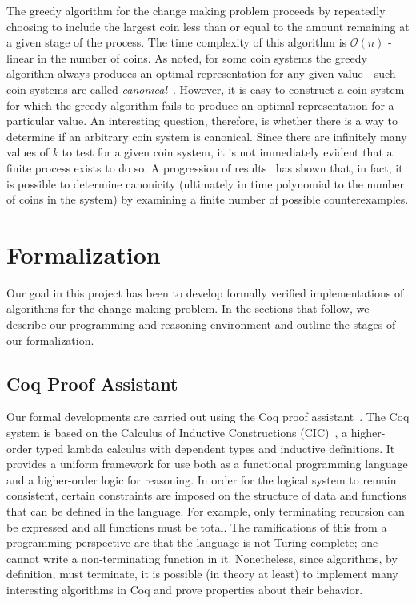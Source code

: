 \documentclass{acm_proc_article-sp}
\begin{document}
The greedy algorithm for the change making problem proceeds by repeatedly choosing to include the largest coin less than or equal to the amount remaining at a given stage of the process. The time complexity of this algorithm is $\mathcal{O}(n)$ - linear in the number of coins.  As noted, for some coin systems the greedy algorithm always produces an optimal representation for any given value - such coin systems are called \emph{canonical}~\cite{?}. However, it is easy to construct a coin system for which the greedy algorithm fails to produce an optimal representation for a particular value. An interesting question, therefore, is whether there is a way to determine if an arbitrary coin system is canonical. Since there are infinitely many values of $k$ to test for a given coin system, it is not immediately evident that a finite process exists to do so. A progression of results~\cite{?,?,?} has shown that, in fact, it is possible to determine canonicity (ultimately in time polynomial to the number of coins in the system) by examining a finite number of possible counterexamples. 



\section{Formalization}

Our goal in this project has been to develop formally verified implementations of algorithms for the change making problem. In the sections that follow, we describe our programming and reasoning environment and outline the stages of our formalization. 

\subsection{Coq Proof Assistant}

Our formal developments are  carried out using the Coq proof assistant~\cite{coq09}. The Coq system is based on 
the Calculus of Inductive Constructions (CIC)~\cite{paulin93}, a higher-order typed lambda calculus with dependent types and inductive definitions. It provides a uniform framework for use  both as a functional programming language and a higher-order logic for reasoning. In order for the logical system to remain consistent, certain constraints are imposed on the structure of data  and functions that can be defined in the language. For example, only terminating recursion can be expressed and all functions must be total. The ramifications of this from a programming perspective are that the language is not Turing-complete; one cannot write a non-terminating function in it. Nonetheless, since algorithms, by definition, must terminate, it is possible (in theory at least) to implement many interesting algorithms in Coq and prove properties about their behavior. 
\end{document}
